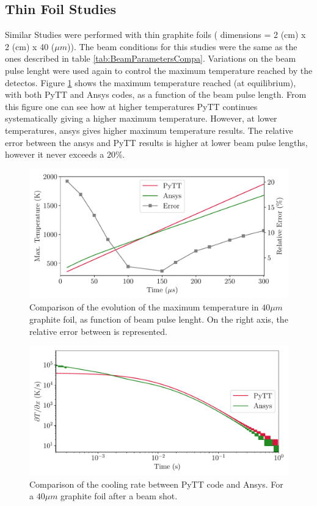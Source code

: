 \subsection{Thin Foil Studies}

Similar Studies were performed with thin graphite foils ( dimensions = 2 (cm) x 2 (cm) x 40 ($\mu m$)). The beam conditions for this studies were the same as the ones described in table \ref{tab:BeamParametersCompa}. Variations on the beam pulse lenght were used again to control the maximum temperature reached by the detectos. Figure \ref{fig:TempMaxErrCompa} shows the maximum temperature reached (at equilibrium), with both PyTT and Ansys codes, as a function of the beam pulse length. From this figure one can see how at higher temperatures PyTT continues systematically giving a higher maximum temperature. However, at lower temperatures, ansys gives higher maximum temperature results. The relative error between the ansys and PyTT results is higher at lower beam pulse lengths, however it never exceeds a $20 \%$.

\begin{figure}[h]
    \centering
    \includegraphics[width=0.6\columnwidth]{ErrorCompa/FoilMaxTempCompa.pdf}
    \caption{Comparison of the evolution of the maximum temperature in $40 \mu m$ graphite foil, as function of beam pulse lenght. On the right axis, the relative error between is represented. }
    \label{fig:TempMaxErrCompa} 
\end{figure}

\begin{figure}[h]
    \centering
    \includegraphics[width=0.6\columnwidth]{CoolingSpeedAnsys/CoolingSpeed.pdf}
    \caption{Comparison of the cooling rate between PyTT code and Ansys. For a $40 \mu m$ graphite foil after a beam shot. }
    \label{fig:CoolingRate} 
\end{figure}

